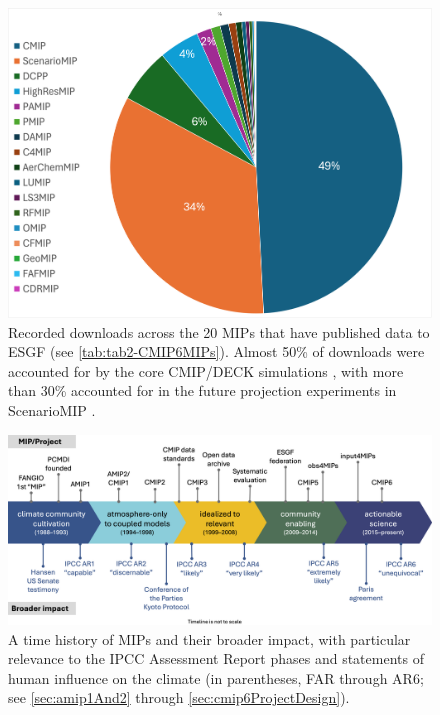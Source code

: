 \documentclass[gmd, preprint]{copernicus}
\begin{document}
\begin{figure}
    \centering
    \includegraphics[width=1\linewidth]{240918_durack1-cmip6-experiments_240903.png}
    \caption{Recorded downloads across the 20 MIPs that have published data to ESGF (see \autoref{tab:tab2-CMIP6MIPs}). Almost 50\% of downloads were accounted for by the core CMIP/DECK simulations \citep{eyring_overview_2016}, with more than 30\% accounted for in the future projection experiments in ScenarioMIP \citep{oneill_scenario_2016}.}
    \label{fig:fig5-MIPDownloads}
\end{figure}

\begin{figure}
    \centering
    \includegraphics[width=\textwidth]{241106_durack1-AMIP-CMIP-IPCC-Impact.png}
    \caption{A time history of MIPs and their broader impact, with particular relevance to the IPCC Assessment Report phases and statements of human influence on the climate (in parentheses, FAR through AR6; see \autoref{sec:amip1And2} through \autoref{sec:cmip6ProjectDesign}).}
    \label{fig:fig6-MIPImpact}
\end{figure}
\end{document}
